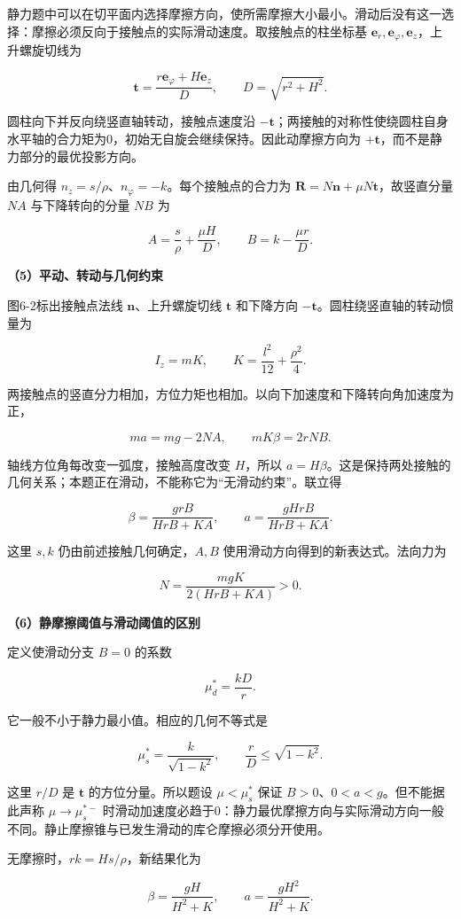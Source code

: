 \documentclass[12pt,a4paper,UTF8]{ctexart}
\begin{document}
静力题中可以在切平面内选择摩擦方向，使所需摩擦大小最小。滑动后没有这一选择：摩擦必须反向于接触点的实际滑动速度。取接触点的柱坐标基
\(\bm e_r,\bm e_\varphi,\bm e_z\)，上升螺旋切线为

\[\bm t=\frac{r\bm e_\varphi+H\bm e_z}{D},\qquad D=\sqrt{r^2+H^2}.\]

圆柱向下并反向绕竖直轴转动，接触点速度沿
\(-\bm t\)；两接触的对称性使绕圆柱自身水平轴的合力矩为0，初始无自旋会继续保持。因此动摩擦方向为
\(+\bm t\)，而不是静力部分的最优投影方向。

由几何得 \(n_z=s/\rho\)、\(n_\varphi=-k\)。每个接触点的合力为
\(\bm R=N\bm n+\mu N\bm t\)，故竖直分量 \(NA\) 与下降转向的分量 \(NB\)
为

\[\boxed{A=\frac{s}{\rho}+\frac{\mu H}{D},\qquad
B=k-\frac{\mu r}{D}.}\]

\textbf{（5）平动、转动与几何约束}

图6-2标出接触点法线 \(\bm n\)、上升螺旋切线 \(\bm t\) 和下降方向
\(-\bm t\)。圆柱绕竖直轴的转动惯量为

\[I_z=mK,\qquad K=\frac{l^2}{12}+\frac{\rho^2}{4}.\]

两接触点的竖直分力相加，方位力矩也相加。以向下加速度和下降转向角加速度为正，

\[ma=mg-2NA,\qquad mK\beta=2rNB.\]

轴线方位角每改变一弧度，接触高度改变 \(H\)，所以
\(a=H\beta\)。这是保持两处接触的几何关系；本题正在滑动，不能称它为``无滑动约束''。联立得

\[\boxed{\beta=\frac{grB}{HrB+KA},\qquad
 a=\frac{gHrB}{HrB+KA}.}\]

这里 \(s,k\) 仍由前述接触几何确定，\(A,B\)
使用滑动方向得到的新表达式。法向力为

\[N=\frac{mgK}{2(HrB+KA)}>0.\]

\textbf{（6）静摩擦阈值与滑动阈值的区别}

定义使滑动分支 \(B=0\) 的系数

\[\mu_d^*=\frac{kD}{r}.\]

它一般不小于静力最小值。相应的几何不等式是

\[\mu_s^*=\frac{k}{\sqrt{1-k^2}},\qquad
\frac rD\le\sqrt{1-k^2}.\]

这里 \(r/D\) 是 \(\bm t\) 的方位分量。所以题设 \(\mu<\mu_s^*\) 保证
\(B>0\)、\(0<a<g\)。但不能据此声称 \(\mu\to\mu_s^{*-}\)
时滑动加速度必趋于0：静力最优摩擦方向与实际滑动方向一般不同。静止摩擦锥与已发生滑动的库仑摩擦必须分开使用。

无摩擦时，\(rk=Hs/\rho\)，新结果化为

\[\boxed{\beta=\frac{gH}{H^2+K},\qquad
 a=\frac{gH^2}{H^2+K}.}\]
\end{document}
